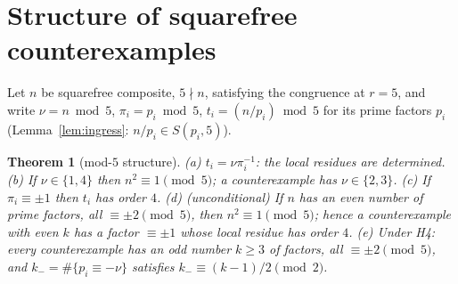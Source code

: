 \documentclass[11pt]{amsart}
\newtheorem{theorem}{Theorem}[section]
\theoremstyle{definition}
\theoremstyle{remark}
\begin{document}
\section{Structure of squarefree counterexamples}\label{sec:structure}

Let $n$ be squarefree composite, $5 \nmid n$, satisfying the congruence at
$r = 5$, and write $\nu = n \bmod 5$, $\pi_i = p_i \bmod 5$,
$t_i = (n/p_i) \bmod 5$ for its prime factors $p_i$
(Lemma~\ref{lem:ingress}: $n/p_i \in S(p_i,5)$).

\begin{theorem}[mod-$5$ structure]\label{thm:structure}
\emph{(a)} $t_i = \nu \pi_i^{-1}$: the local residues are determined.
\emph{(b)} If $\nu \in \{1,4\}$ then $n^2 \equiv 1 \pmod 5$; a
counterexample has $\nu \in \{2,3\}$.
\emph{(c)} If $\pi_i \equiv \pm1$ then $t_i$ has order $4$.
\emph{(d)} (unconditional) If $n$ has an even number of prime factors, all
$\equiv \pm2 \pmod 5$, then $n^2 \equiv 1 \pmod 5$; hence a counterexample
with even $k$ has a factor $\equiv \pm1$ whose local residue has order $4$.
\emph{(e)} Under H4: every counterexample has an odd number $k \ge 3$ of
factors, all $\equiv \pm2 \pmod 5$, and $k_- = \#\{p_i \equiv -\nu\}$
satisfies $k_- \equiv (k-1)/2 \pmod 2$.
\end{theorem}
\end{document}
